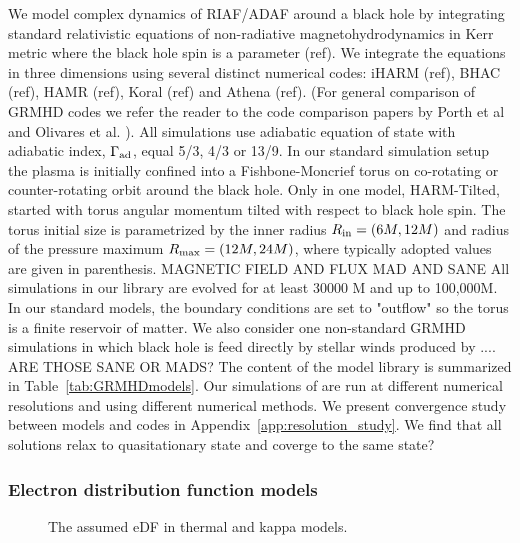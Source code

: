 We model complex dynamics of RIAF/ADAF around a black hole by integrating standard relativistic equations of  non-radiative magnetohydrodynamics in Kerr metric where the black hole spin is a parameter (ref). We integrate the equations in three dimensions using several distinct numerical codes: iHARM (ref), BHAC (ref), HAMR (ref), Koral (ref) and Athena (ref). (For general comparison of GRMHD codes we refer the reader to the code comparison papers by Porth et al and Olivares et al. ).
All simulations use adiabatic equation of state with adiabatic index, $\Gamma_{\rm ad}$, equal 5/3, 4/3 or 13/9.
In our standard simulation setup the plasma is initially confined into a Fishbone-Moncrief torus on co-rotating or counter-rotating orbit around the black hole. Only in one model, HARM-Tilted, started with torus angular momentum tilted with respect to black hole spin. The torus initial size is parametrized by the inner radius $R_{\rm in}=(6M,12M)$ and radius of the pressure maximum $R_{\rm max}=(12M,24M)$, where typically adopted values are given in parenthesis.  MAGNETIC FIELD AND FLUX MAD AND SANE
All simulations in our library are evolved for at least 30000 M and up to 100,000M. In our standard models, the boundary conditions are set to "outflow" so the torus is a finite reservoir of matter.
We also consider one non-standard GRMHD simulations in which \sgra black hole is feed directly by stellar winds produced by .... ARE THOSE SANE OR MADS?
The content of the model library is summarized in Table~\ref{tab:GRMHDmodels}. Our simulations of \sgra are run at different numerical resolutions and using different numerical methods. We present convergence study between models and codes in Appendix~\ref{app:resolution_study}. We find that all solutions relax to quasitationary state and coverge to the same state?

\subsubsection{Electron distribution function models}

\begin{figure}
  \caption{The assumed eDF in thermal and kappa models.}
  \label{fig:eDF}
\end{figure}


